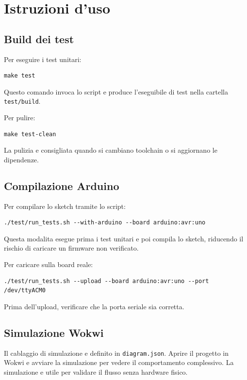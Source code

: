 \chapter{Istruzioni d'uso}

\section{Build dei test}
Per eseguire i test unitari:
\begin{lstlisting}[style=cppstyle]
make test
\end{lstlisting}
Questo comando invoca lo script e produce l'eseguibile di test nella cartella \texttt{test/build}.

Per pulire:
\begin{lstlisting}[style=cppstyle]
make test-clean
\end{lstlisting}
La pulizia e consigliata quando si cambiano toolchain o si aggiornano le dipendenze.

\section{Compilazione Arduino}
Per compilare lo sketch tramite lo script:
\begin{lstlisting}[style=cppstyle]
./test/run_tests.sh --with-arduino --board arduino:avr:uno
\end{lstlisting}
Questa modalita esegue prima i test unitari e poi compila lo sketch, riducendo il rischio di caricare un firmware non verificato.

Per caricare sulla board reale:
\begin{lstlisting}[style=cppstyle]
./test/run_tests.sh --upload --board arduino:avr:uno --port /dev/ttyACM0
\end{lstlisting}
Prima dell'upload, verificare che la porta seriale sia corretta.

\section{Simulazione Wokwi}
Il cablaggio di simulazione e definito in \texttt{diagram.json}. Aprire il progetto in Wokwi e avviare la simulazione per vedere il comportamento complessivo. La simulazione e utile per validare il flusso senza hardware fisico.
